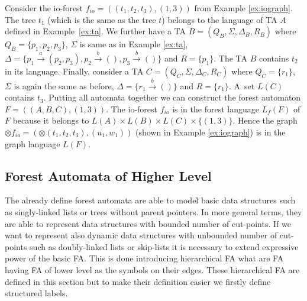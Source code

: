 \documentclass[a4paper, 12pt]{article}
\begin{document}
\bexmp
Consider the io-forest $f_{io}=((t_1,t_2,t_3), (1,3))$ from Example \ref{ex:iograph}.
The tree $t_1$ (which is the same as the tree $t$) belongs to the language of TA $A$
defined in Example~\ref{ex:ta}.
We further have a TA $B=(Q_B,\Sigma, \Delta_B, R_B)$ where $Q_B=\{p_1,p_2,p_3\}$,
$\Sigma$ is same as in Example \ref{ex:ta},
$\Delta=\{p_1 \xrightarrow{a} (p_2,p_3),
p_2 \xrightarrow{b} (),
p_3 \xrightarrow{b} ()\}$
and $R=\{p_1\}$.
The TA $B$ contains $t_2$ in its language.
Finally, consider a TA $C=(Q_C,\Sigma, \Delta_C, R_C)$ where $Q_C=\{r_1\}$,
$\Sigma$ is again the same as before,
$\Delta= \{r_1 \xrightarrow{b} ()\}$
and $R=\{r_1\}$.
A~set $L(C)$ contains $t_3$.
Putting all automata together we can construct the forest automaton $F=((A,B,C),(1,3))$.
The io-forest $f_{io}$ is in the forest language $L_f(F)$ of $F$ because it belongs
to $L(A) \times L(B) \times L(C) \times \{(1,3)\}$.
Hence the graph $\otimes f_{io} = (\otimes (t_1,t_2,t_3),(u_1,w_1))$
(shown in Example \ref{ex:iograph}) is in the graph language $L(F)$.
\eexmp

\subsection{Forest Automata of Higher Level}
\label{sec:fah}

The already define forest automata are able to model basic data structures
such as singly-linked lists or trees without parent pointers.
In more general terms, they are able to represent data structures
with bounded number of cut-points.
If we want to represent also dynamic data structures with unbounded
number of cut-points such as doubly-linked lists or skip-lists it
is necessary to extend expressive power of the basic FA.
This is done introducing hierarchical FA what are FA having FA of lower level
as the symbols on their edges.
These hierarchical FA are defined in this section but to make their
definition easier we firstly define structured labels.
\end{document}
